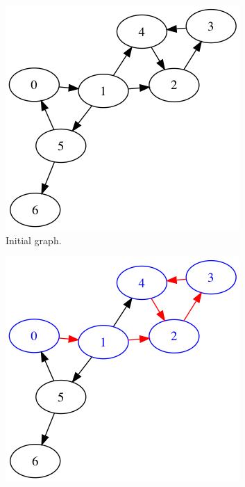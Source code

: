 \begin{figure}
\centering

\begin{subfigure}{0.30\textwidth}
\includegraphics[width=\linewidth]{images/tarjan/0.png}
\caption{Initial graph.} \label{fig:tarjan0}
\end{subfigure}
\hspace*{\fill} %
\begin{subfigure}{0.3\textwidth}
\includegraphics[width=\linewidth]{images/tarjan/1.png}

\end{subfigure}
\end{figure}
